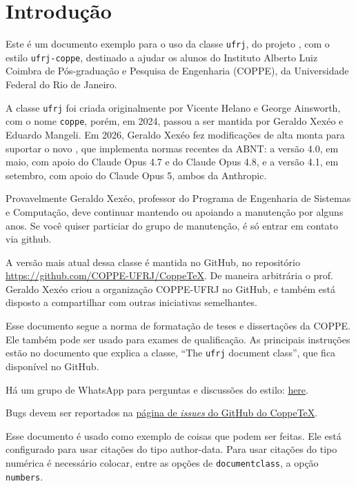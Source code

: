 \documentclass[dsc,pdfa,setavermelha]{ufrj}
\theoremstyle{plain}
\theoremstyle{definition}
\theoremstyle{remark}
\begin{document}
  \mainmatter
  \chapter{Introdução}

  Este é um documento exemplo para o uso da classe \verb|ufrj|, do projeto \CoppeTeX, com o estilo \verb|ufrj-coppe|, destinado a ajudar os alunos do Instituto Alberto Luiz Coimbra de Pós-graduação e Pesquisa de Engenharia (COPPE), da Universidade Federal do Rio de Janeiro.

  A classe \verb|ufrj| foi criada originalmente por Vicente Helano e George Ainsworth, com o nome \verb|coppe|, porém, em 2024, passou a ser mantida por Geraldo Xexéo e Eduardo Mangeli.
  Em 2026, Geraldo Xexéo fez modificações de alta monta para suportar o novo , que implementa normas recentes da ABNT: a versão 4.0, em maio, com apoio do Claude Opus 4.7 e do Claude Opus 4.8, e a versão 4.1, em setembro, com apoio do Claude Opus 5, ambos da Anthropic.

   Provavelmente Geraldo Xexéo, professor do Programa de Engenharia de Sistemas e Computação, deve continuar mantendo ou apoiando a manutenção por alguns anos. Se você quiser particiar do grupo de manutenção, é só entrar em contato via github.

  A versão mais atual dessa classe é mantida no GitHub, no repositório \url{https://github.com/COPPE-UFRJ/CoppeTeX}. De maneira arbitrária o prof. Geraldo Xexéo criou a organização COPPE-UFRJ no GitHub, e também está disposto a compartilhar com outras iniciativas semelhantes.

  Esse documento segue a norma de formatação de teses e dissertações da COPPE. Ele também pode ser usado para exames de qualificação. As principais instruções estão no documento que explica a classe, ``The \verb|ufrj| document class'', que fica disponível no GitHub.

  Há um grupo de WhatsApp para perguntas e discussões do estilo: \href{https://github.com/COPPE-UFRJ/CoppeTeX/wiki}{here}.

  Bugs devem ser reportados na \href{https://github.com/COPPE-UFRJ/CoppeTeX/issues}{página de \textit{issues} do GitHub do CoppeTeX}.

  Esse documento é usado como exemplo de coisas que podem ser feitas. Ele está configurado para usar citações do tipo author-data. Para usar citações do tipo numérica é necessário colocar, entre as opções de \verb|documentclass|, a opção \verb|numbers|.
\end{document}
